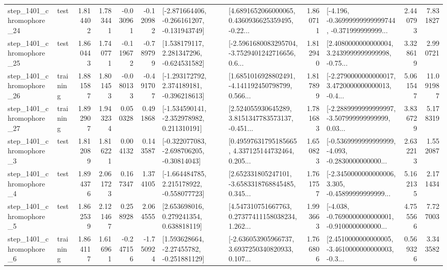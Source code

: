 \begin{tabular}{llrrrrllrlrr}
 step\_1401\_chromophore\_24 &      test &      1.814402 &    1.783441 &     -0.030961 & -0.120982 &  [-2.871664406, -0.266161207, -0.131943749] &  [4.6891652066000065, 0.4360936625359495, -0.22... &       1.860711 &  [-4.196, -0.36999999999999744, -0.371999999999... &            2.440793 &          7.831827 \\
 step\_1401\_chromophore\_25 &      test &      1.860443 &    1.740771 &     -0.119672 & -0.789799 &    [1.538179117, 2.281347296, -0.624531582] &  [-2.5961680083295704, -3.7529401242716656, 0.6... &       1.812940 &  [2.4080000000000004, 3.2439999999999998, -0.75... &            3.328619 &          2.990721 \\
 step\_1401\_chromophore\_26 &  training &      1.881587 &    1.801453 &     -0.080133 & -0.491707 &   [-1.293172792, 2.374189181, -0.396218613] &  [1.6851016928802491, -4.141192450798799, 0.566... &       1.817899 &  [-2.2790000000000017, 3.4720000000000013, -0.4... &            5.061547 &         11.091987 \\
 step\_1401\_chromophore\_27 &  training &      1.892907 &    1.943234 &      0.050328 &  0.491868 &   [-1.534590141, -2.352978982, 0.211310191] &  [2.524055930645289, 3.8151347783573137, -0.451... &       1.781683 &  [-2.2889999999999997, -3.507999999999999, 0.03... &            3.836729 &          5.178319 \\
  step\_1401\_chromophore\_3 &      test &      1.812089 &    1.816221 &      0.004132 &  0.143587 &   [-0.322077083, -2.698706205, -0.30814043] &  [0.49597631795185665, 4.337125144732464, 0.205... &       1.650823 &  [-0.5369999999999999, -4.093, -0.2830000000000... &            2.632213 &          1.552087 \\
  step\_1401\_chromophore\_4 &      test &      1.894376 &    2.061723 &      0.167347 &  1.374105 &   [-1.664484785, 2.215178922, -0.558077723] &  [2.652331805247101, -3.6583318768845485, 0.345... &       1.761757 &  [-2.3450000000000006, 3.305, -0.45899999999999... &            5.162135 &          2.171434 \\
  step\_1401\_chromophore\_5 &      test &      1.862539 &    2.121467 &      0.258928 &  2.064555 &     [2.653698016, 0.279241354, 0.638818119] &  [4.547310751667763, 0.27377411158038234, 1.262... &       1.993663 &  [-4.038, -0.7690000000000001, -0.9100000000000... &            4.755566 &          7.727003 \\
  step\_1401\_chromophore\_6 &  training &      1.864117 &    1.616961 &     -0.247156 & -1.750924 &    [1.593628664, -2.27455782, -0.251881129] &  [-2.636053905966737, 3.6937250340820933, 0.107... &       1.766806 &  [2.4510000000000005, -3.4610000000000003, -0.3... &            0.569326 &          3.343582 \\

\end{tabular}
